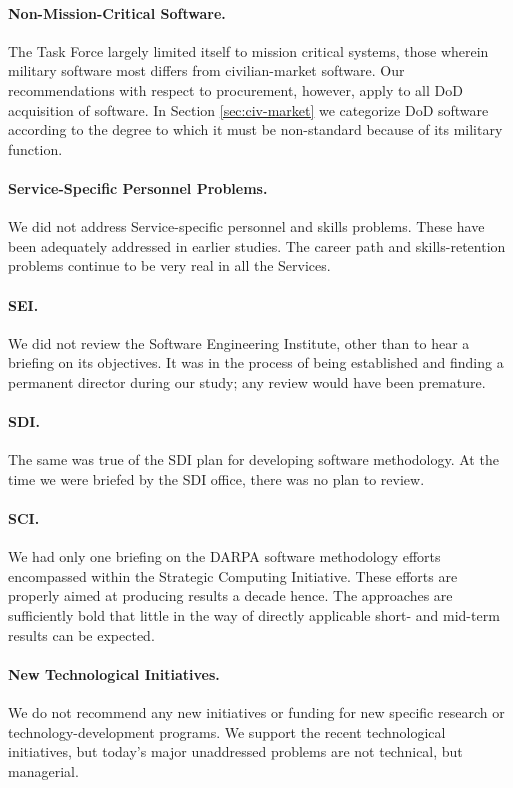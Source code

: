 \documentclass[12pt,final]{article}
\begin{document}
\paragraph{Non-Mission-Critical Software.} The Task Force largely limited
itself to mission critical systems, those wherein military software most
differs from civilian-market software.  Our recommendations with respect to
procurement, however, apply to all DoD acquisition of software. In Section
\ref{sec:civ-market} we categorize DoD software according to the degree to
which it must be non-standard because of its military function.

\paragraph{Service-Specific Personnel Problems.} We did not address
Service-specific personnel and skills problems. These have been adequately
addressed in earlier studies. The career path and skills-retention problems
continue to be very real in all the Services.

\paragraph{SEI.} We did not review the Software Engineering Institute, other
than to hear a briefing on its objectives. It was in the process of being
established and finding a permanent director during our study; any review would
have been premature.

\paragraph{SDI.} The same was true of the SDI plan for developing software
methodology. At the time we were briefed by the SDI office, there was no plan
to review.

\paragraph{SCI.} We had only one briefing on the DARPA software methodology
efforts encompassed within the Strategic Computing Initiative. These efforts
are properly aimed at producing results a decade hence. The approaches are
sufficiently bold that little in the way of directly applicable short- and
mid-term results can be expected.

\paragraph{New Technological Initiatives.} We do not recommend any new
initiatives or funding for new specific research or technology-development
programs. We support the recent technological initiatives, but today’s major
unaddressed problems are not technical, but managerial.
\end{document}
